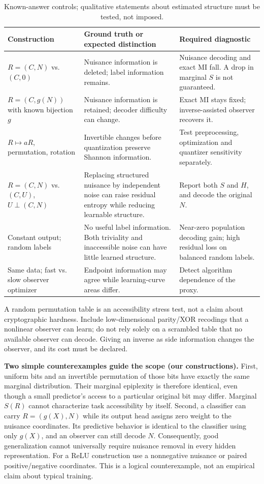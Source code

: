 \documentclass[11pt,a4paper]{article}
\begin{document}
\begin{table}[htbp]
\small
\begin{tabularx}{\linewidth}{@{}>{\raggedright\arraybackslash}p{3.05cm}LL@{}}
\toprule
Construction & Ground truth or expected distinction & Required diagnostic\\
\midrule
$R=(C,N)$ vs. $(C,0)$ & Nuisance information is deleted; label information remains. & Nuisance decoding and exact MI fall. A drop in marginal $S$ is not guaranteed.\\
$R=(C,g(N))$ with known bijection $g$ & Nuisance information is retained; decoder difficulty can change. & Exact MI stays fixed; inverse-assisted observer recovers it.\\
$R\mapsto aR$, permutation, rotation & Invertible changes before quantization preserve Shannon information. & Test preprocessing, optimization and quantizer sensitivity separately.\\
$R=(C,N)$ vs. $(C,U)$, $U\perp(C,N)$ & Replacing structured nuisance by independent noise can raise residual entropy while reducing learnable structure. & Report both $S$ and $H$, and decode the original $N$.\\
Constant output; random labels & No useful label information. Both triviality and inaccessible noise can have little learned structure. & Near-zero population decoding gain; high residual loss on balanced random labels.\\
Same data; fast vs. slow observer optimizer & Endpoint information may agree while learning-curve areas differ. & Detect algorithm dependence of the proxy.\\
\bottomrule
\end{tabularx}
\caption{Known-answer controls; qualitative statements about estimated structure must be tested, not imposed.}
\end{table}

A random permutation table is an accessibility stress test, not a claim about cryptographic hardness. Include low-dimensional parity/XOR recodings that a nonlinear observer can learn; do not rely solely on a scrambled table that no available observer can decode. Giving an inverse as side information changes the observer, and its cost must be declared.

\textbf{Two simple counterexamples guide the scope (our constructions).} First, uniform bits and an invertible permutation of those bits have exactly the same marginal distribution. Their marginal epiplexity is therefore identical, even though a small predictor's access to a particular original bit may differ. Marginal $S(R)$ cannot characterize task accessibility by itself. Second, a classifier can carry $R=(g(X),N)$ while its output head assigns zero weight to the nuisance coordinates. Its predictive behavior is identical to the classifier using only $g(X)$, and an observer can still decode $N$. Consequently, good generalization cannot universally require nuisance removal in every hidden representation. For a ReLU construction use a nonnegative nuisance or paired positive/negative coordinates. This is a logical counterexample, not an empirical claim about typical training.
\end{document}
